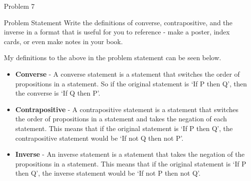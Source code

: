 \begin{problem}{Problem 7}
    \begin{statement}{Problem Statement}
        Write the definitions of converse, contrapositive, and the inverse in a format that is useful for you to reference - make a poster, index cards, or even make notes in your book.
    \end{statement}
    
    \begin{highlight}[Solution]
        My definitions to the above in the problem statement  can be seen below.

        \begin{itemize}
            \item \textbf{Converse} - A converse statement is a statement that switches the order of propositions in a statement. So if the original statement is `If P then Q', then 
            the converse is `If Q then P'.
            \item \textbf{Contrapositive} - A contrapositive statement is a statement that switches the order of propositions in a statement and takes the negation of each statement. This
            means that if the original statement is `If P then Q', the contrapositive statement would be `If not Q then not P'.
            \item \textbf{Inverse} - An inverse statement is a statement that takes the negation of the propositions in a statement. This means that if the original statement is `If P then Q',
            the inverse statement would be `If not P then not Q'.
        \end{itemize}
    \end{highlight}
\end{problem}

